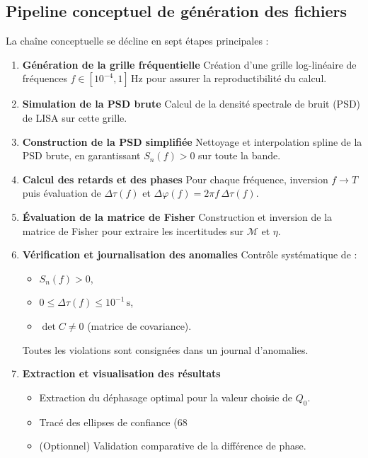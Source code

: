 \subsection{Pipeline conceptuel de génération des fichiers}
La chaîne conceptuelle se décline en sept étapes principales :

\begin{enumerate}
  \item \textbf{Génération de la grille fréquentielle}
    Création d’une grille log-linéaire de fréquences $f\in[10^{-4},1]\,$Hz
    pour assurer la reproductibilité du calcul.

  \item \textbf{Simulation de la PSD brute}
    Calcul de la densité spectrale de bruit (PSD) de LISA sur cette grille.

  \item \textbf{Construction de la PSD simplifiée}
    Nettoyage et interpolation spline de la PSD brute, en garantissant
    $S_n(f)>0$ sur toute la bande.

  \item \textbf{Calcul des retards et des phases}
    Pour chaque fréquence, inversion $f\to T$ puis évaluation de
    \(\Delta\tau(f)\) et \(\Delta\varphi(f)=2\pi f\,\Delta\tau(f)\).

  \item \textbf{Évaluation de la matrice de Fisher}
    Construction et inversion de la matrice de Fisher pour extraire les
    incertitudes sur \(\mathcal{M}\) et \(\eta\).

  \item \textbf{Vérification et journalisation des anomalies}
    Contrôle systématique de :
    \begin{itemize}
      \item \(S_n(f)>0\),
      \item \(0 \le \Delta\tau(f)\le 10^{-1}\,\mathrm{s}\),
      \item \(\det C \neq 0\) (matrice de covariance).
    \end{itemize}
    Toutes les violations sont consignées dans un journal d’anomalies.

  \item \textbf{Extraction et visualisation des résultats}
    \begin{itemize}
      \item Extraction du déphasage optimal pour la valeur choisie de \(Q_0\).
      \item Tracé des ellipses de confiance (68 %
      \item (Optionnel) Validation comparative de la différence de phase.
    \end{itemize}
\end{enumerate}

